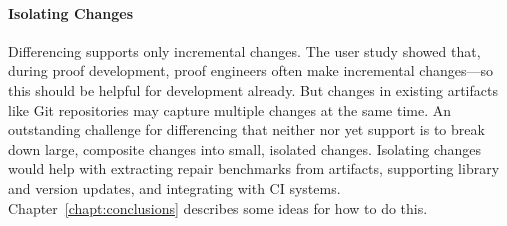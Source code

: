 \paragraph{Isolating Changes} Differencing supports only incremental changes.
The  user study showed that, during proof development,
proof engineers often make incremental changes---so this should be helpful for development already.
But changes in existing artifacts like Git repositories may capture multiple changes at the same time.
An outstanding challenge for differencing that neither \sysname nor \toolnamec yet support
is to break down large, composite changes into small, isolated changes.
Isolating changes would help with extracting repair benchmarks from artifacts, supporting library and version updates, and integrating with CI systems.
Chapter~\ref{chapt:conclusions} describes some ideas for how to do this.



